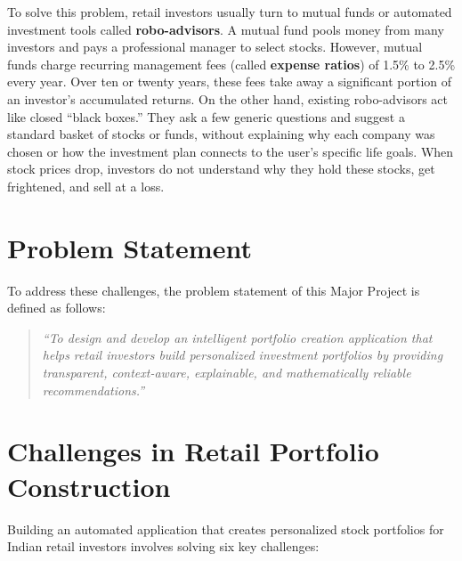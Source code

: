 To solve this problem, retail investors usually turn to mutual funds or automated investment tools called \textbf{robo-advisors}. A mutual fund pools money from many investors and pays a professional manager to select stocks. However, mutual funds charge recurring management fees (called \textbf{expense ratios}) of 1.5\% to 2.5\% every year. Over ten or twenty years, these fees take away a significant portion of an investor's accumulated returns. On the other hand, existing robo-advisors act like closed ``black boxes.'' They ask a few generic questions and suggest a standard basket of stocks or funds, without explaining why each company was chosen or how the investment plan connects to the user's specific life goals. When stock prices drop, investors do not understand why they hold these stocks, get frightened, and sell at a loss.

\section{Problem Statement}
To address these challenges, the problem statement of this Major Project is defined as follows:

\begin{quote}
\textit{``To design and develop an intelligent portfolio creation application that helps retail investors build personalized investment portfolios by providing transparent, context-aware, explainable, and mathematically reliable recommendations.''}
\end{quote}

\section{Challenges in Retail Portfolio Construction}
Building an automated application that creates personalized stock portfolios for Indian retail investors involves solving six key challenges:

